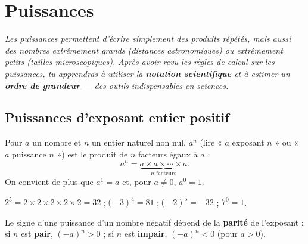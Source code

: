 \chapter{Puissances}

\noindent\textit{Les puissances permettent d'écrire simplement des produits répétés, mais
aussi des nombres extrêmement grands (distances astronomiques) ou extrêmement petits (tailles
microscopiques). Après avoir revu les règles de calcul sur les puissances, tu apprendras à
utiliser la \textbf{notation scientifique} et à estimer un \textbf{ordre de grandeur} — des
outils indispensables en sciences.}
\vspace{8pt}

\connecteBanner

\section{Puissances d'exposant entier positif}

\begin{definition}
Pour $a$ un nombre et $n$ un entier naturel non nul, $a^n$ (lire « $a$ exposant $n$ » ou
« $a$ puissance $n$ ») est le produit de $n$ facteurs égaux à $a$ :
\[
a^{n}=\underbrace{a\times a\times\cdots\times a}_{n\text{ facteurs}}.
\]
On convient de plus que $a^{1}=a$ et, pour $a\ne0$, $a^{0}=1$.
\end{definition}

\begin{exemple}
$2^{5}=2\times2\times2\times2\times2=32$ ;\quad $(-3)^{4}=81$ ;\quad $(-2)^{5}=-32$ ;\quad
$7^{0}=1$.
\end{exemple}

\begin{remarque}
Le signe d'une puissance d'un nombre négatif dépend de la \textbf{parité} de l'exposant :
si $n$ est \textbf{pair}, $(-a)^{n}>0$ ; si $n$ est \textbf{impair}, $(-a)^{n}<0$ (pour
$a>0$).
\end{remarque}

\begin{illus}
\end{illus}

